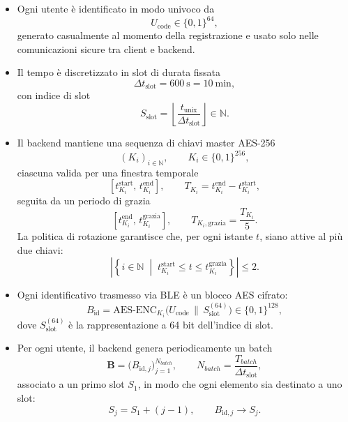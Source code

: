 \documentclass[a4paper,11pt]{article}
\begin{document}
\begin{itemize}
  \item Ogni utente è identificato in modo univoco da
        \[
          U_{\text{code}} \in \{0,1\}^{64},
        \]
        generato casualmente al momento della registrazione e usato solo nelle comunicazioni
        sicure tra client e backend.

  \item Il tempo è discretizzato in slot di durata fissata
        \[
          \Delta t_{\text{slot}} = \SI{600}{\second} = \SI{10}{\minute},
        \]
        con indice di slot
        \[
          S_{\text{slot}} = \left\lfloor \frac{t_{\text{unix}}}{\Delta t_{\text{slot}}} \right\rfloor
          \in \mathbb{N}.
        \]

  \item Il backend mantiene una sequenza di chiavi master AES-256
        \[
          (K_i)_{i\in\mathbb{N}}, \qquad K_i \in \{0,1\}^{256},
        \]
        ciascuna valida per una finestra temporale
        \[
          [t_{K_i}^{\text{start}},\, t_{K_i}^{\text{end}}],
          \qquad T_{K_i} = t_{K_i}^{\text{end}} - t_{K_i}^{\text{start}},
        \]
        seguita da un periodo di grazia
        \[
          [t_{K_i}^{\text{end}},\, t_{K_i}^{\text{grazia}}],
          \qquad T_{K_i,\mathrm{grazia}} = \frac{T_{K_i}}{5}.
        \]
        La politica di rotazione garantisce che, per ogni istante \(t\), siano attive al più due
        chiavi:
        \[
          \left|
          \left\{
          i \in \mathbb{N}
          \;\middle|\;
          t_{K_i}^{\text{start}} \le t \le t_{K_i}^{\text{grazia}}
          \right\}
          \right| \le 2.
        \]

  \item Ogni identificativo trasmesso via BLE è un blocco AES cifrato:
        \[
          B_{\text{id}} =
          \mathrm{AES\text{-}ENC}_{K_i}\bigl(U_{\text{code}} \,\|\, S_{\text{slot}}^{(64)}\bigr)
          \in \{0,1\}^{128},
        \]
        dove \(S_{\text{slot}}^{(64)}\) è la rappresentazione a 64 bit dell’indice di slot.

  \item Per ogni utente, il backend genera periodicamente un batch
        \[
          \mathbf{B} = \bigl(B_{\text{id},j}\bigr)_{j=1}^{N_{batch}},
          \qquad N_{batch} = \frac{T_{batch}}{\Delta t_{\text{slot}}},
        \]
        associato a un primo slot \(S_1\), in modo che ogni elemento sia destinato a uno slot:
        \[
          S_j = S_1 + (j-1), \qquad B_{\text{id},j} \longrightarrow S_j.
        \]


\end{itemize}
\end{document}
